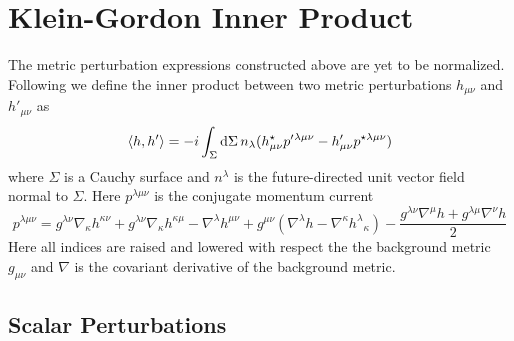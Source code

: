 \documentclass{brownthesis}
\def\dd{{\rm d}}
\begin{document}
\section{Klein-Gordon Inner Product}

The metric perturbation expressions constructed above are yet to be
normalized. Following \cite{doi:10.1142/S0218271816410169} we define
the inner product between two metric perturbations $h_{\mu\nu}$ and
$h'_{\mu\nu}$ as
\[
\langle h,h'\rangle=-i\int_{\Sigma}\dd\Sigma\,n_{\lambda}(h_{\mu\nu}^{\star}p'{}^{\lambda\mu\nu}-h'_{\mu\nu}p^{\star\lambda\mu\nu})
\]
where $\Sigma$ is a Cauchy surface and $n^{\lambda}$ is the future-directed
unit vector field normal to $\Sigma$. Here $p^{\lambda\mu\nu}$ is
the conjugate momentum current
\[
p^{\lambda\mu\nu}=g^{\lambda\nu}\nabla_{\kappa}h^{\kappa\nu}+g^{\lambda\nu}\nabla_{\kappa}h^{\kappa\mu}-\nabla^{\lambda}h^{\mu\nu}+g^{\mu\nu}(\nabla^{\lambda}h-\nabla^{\kappa}h^{\lambda}{}_{\kappa})-\frac{g^{\lambda\nu}\nabla^{\mu}h+g^{\lambda\mu}\nabla^{\nu}h}{2}
\]
Here all indices are raised and lowered with respect the the background
metric $g_{\mu\nu}$ and $\nabla$ is the covariant derivative of
the background metric.

\subsection{Scalar Perturbations}
\end{document}
